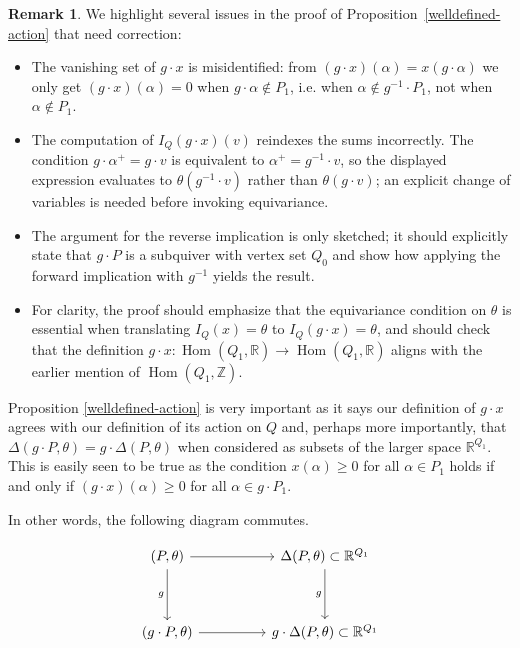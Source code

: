 \documentclass[11pt]{amsart}
\theoremstyle{plain}
\theoremstyle{definition}
\newtheorem{remark}[theorem]{Remark}
\newcommand{\R}{\mathbb{R}}
\newcommand{\Z}{\mathbb{Z}}
\DeclareMathOperator{\Hom}{Hom}
\renewcommand{\hom}{\Hom}
\begin{document}
\begin{remark}\label{codex_edit}
    We highlight several issues in the proof of Proposition~\ref{welldefined-action} that need correction:
    \begin{itemize}
        \item The vanishing set of $g\cdot x$ is misidentified: from $(g\cdot x)(\alpha)=x(g\cdot\alpha)$ we only get $(g\cdot x)(\alpha)=0$ when $g\cdot\alpha\notin P_1$, i.e. when $\alpha\notin g^{-1}\!\cdot P_1$, not when $\alpha\notin P_1$.
        \item The computation of $I_Q(g\cdot x)(v)$ reindexes the sums incorrectly. The condition $g\cdot \alpha^+=g\cdot v$ is equivalent to $\alpha^+=g^{-1}\!\cdot v$, so the displayed expression evaluates to $\theta(g^{-1}\!\cdot v)$ rather than $\theta(g\cdot v)$; an explicit change of variables is needed before invoking equivariance.
        \item The argument for the reverse implication is only sketched; it should explicitly state that $g\cdot P$ is a subquiver with vertex set $Q_0$ and show how applying the forward implication with $g^{-1}$ yields the result.
        \item For clarity, the proof should emphasize that the equivariance condition on $\theta$ is essential when translating $I_Q(x)=\theta$ to $I_Q(g\cdot x)=\theta$, and should check that the definition $g\cdot x:\hom(Q_1,\R)\to\hom(Q_1,\R)$ aligns with the earlier mention of $\hom(Q_1,\Z)$.
    \end{itemize}
\end{remark}


Proposition \ref{welldefined-action} is very important as it says our definition of $g \cdot x$ agrees with our definition of its action on $Q$ and, perhaps more importantly, that $\Delta(g \cdot P, \theta) = g \cdot \Delta(P, \theta)$ when considered as subsets of the larger space $\R^{Q_1}$. This is easily seen to be true as the condition $x(\alpha) \geq 0$ for all $\alpha \in P_1$ holds if and only if $(g\cdot x)(\alpha) \geq 0$ for all $\alpha \in g \cdot P_1$. 

In other words, the following diagram commutes.

\[\begin{tikzcd} \label{flow-equivariant-diagram} 
	{(P, \theta)} && {\Delta(P, \theta)  \subset \R^{Q_1}} \\
	\\
	{(g \cdot P, \theta)} && {g \cdot \Delta(P, \theta) \subset \R^{Q_1}}
	\arrow[from=1-1, to=1-3]
	\arrow["g"', from=1-1, to=3-1]
	\arrow["g"', from=1-3, to=3-3]
	\arrow[from=3-1, to=3-3]
\end{tikzcd}\]
\end{document}
